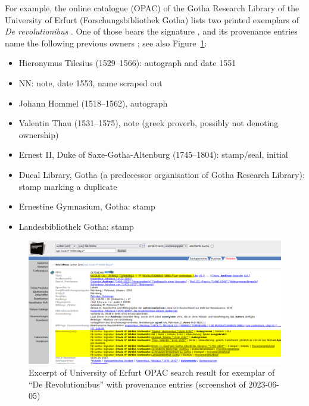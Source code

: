 For example, the online catalogue (OPAC) of the Gotha Research Library of the University of \foreignlanguage{ngerman}{Erfurt (Forschungsbibliothek Gotha)} lists two printed exemplars
of \emph{De revolutionibus} \autocite{OPACDeRev}.
One of those bears the signature , and its provenance entries name the following previous owners \autocite{OPACDeRevPPN}; see also Figure~\ref{fig:OPAC_derev_provenance}:
%
\begin{itemize}
  \item
    \foreignlanguage{latin}{Hieronymus Tilesius} (1529–1566): autograph and date 1551
  \item
    NN: note, date 1553, name scraped out
  \item
    \foreignlanguage{ngerman}{Johann Hommel} (1518–1562), autograph
  \item
    \foreignlanguage{ngerman}{Valentin Thau} (1531–1575), note (greek proverb, possibly not denoting ownership)
  \item
    Ernest II, Duke of Saxe-\foreignlanguage{ngerman}{Gotha-Altenburg} (1745–1804): stamp/seal, initial
  \item
    Ducal Library, \foreignlanguage{ngerman}{Gotha} (a predecessor organisation of \foreignlanguage{ngerman}{Gotha} Research Library): stamp marking a duplicate
  \item
    Ernestine Gymnasium, \foreignlanguage{ngerman}{Gotha}: stamp
  \item
    \foreignlanguage{ngerman}{Landesbibliothek Gotha}: stamp
\end{itemize}

\begin{figure}[ht]
  \centering
  \includegraphics[width=\linewidth,trim=88 1 26 123,clip]{img/opac_derev_prov.png}
  \caption[%
    Excerpt of University of \foreignlanguage{ngerman}{Erfurt} OPAC search result for
    exemplar  of
    \enquote{\foreignlanguage{latin}{De Revolutionibus}} with provenance entries%
  ]{%
    Excerpt of University of \foreignlanguage{ngerman}{Erfurt} OPAC search result
    for exemplar  of
    \enquote{\foreignlanguage{ngerman}{De Revolutionibus}} with provenance entries
    (screenshot of 2023-06-05)%
  }
  \label{fig:OPAC_derev_provenance}
\end{figure}

